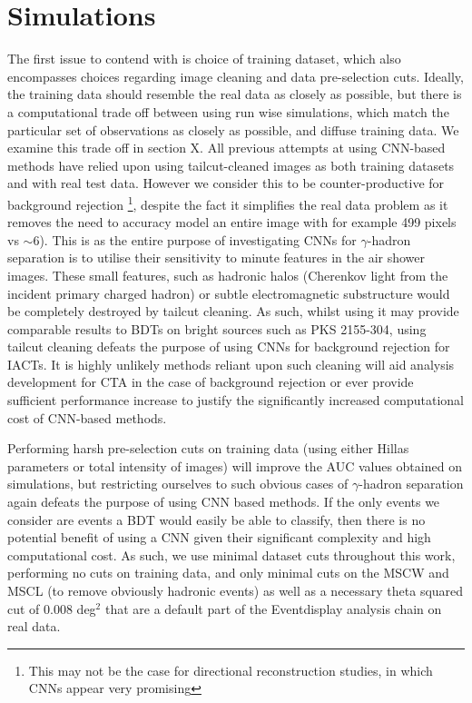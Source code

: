 \section{Simulations}
The first issue to contend with is choice of training dataset, which also encompasses choices regarding image cleaning and data pre-selection cuts. Ideally, the training data should resemble the real data as closely as possible, but there is a computational trade off between using run wise simulations, which match the particular set of observations as closely as possible, and diffuse training data. We examine this trade off in section X. All previous attempts at using CNN-based methods have relied upon using tailcut-cleaned images \cite{Shilon} as both training datasets and with real test data. However we consider this to be counter-productive for background rejection \footnote{This may not be the case for directional reconstruction studies, in which CNNs appear very promising}, despite the fact it simplifies the real data problem as it removes the need to accuracy model an entire image with for example 499 pixels vs $\sim$6). This is as the entire purpose of investigating CNNs for $\gamma$-hadron separation is to utilise their sensitivity to minute features in the air shower images. These small features, such as hadronic halos \cite{model++}(Cherenkov light from the incident primary charged hadron) or subtle electromagnetic substructure would be completely destroyed by tailcut cleaning. As such, whilst using it may provide comparable results to BDTs on bright sources such as PKS 2155-304, using tailcut cleaning defeats the purpose of using CNNs for background rejection for IACTs. It is highly unlikely methods reliant upon such cleaning will aid analysis development for CTA in the case of background rejection or ever provide sufficient performance increase to justify the significantly increased computational cost of CNN-based methods.

Performing harsh pre-selection cuts on training data (using either Hillas parameters or total intensity of images) will improve the AUC values obtained on simulations, but restricting ourselves to such obvious cases of $\gamma$-hadron separation again defeats the purpose of using CNN based methods. If the only events we consider are events a BDT would easily be able to classify, then there is no potential benefit of using a CNN given their significant complexity and high computational cost. As such, we use minimal dataset cuts throughout this work, performing no cuts on training data, and only minimal cuts on the MSCW and MSCL (to remove obviously hadronic events) as well as a necessary theta squared cut of 0.008 deg$^2$ that are a default part of the Eventdisplay analysis chain on real data.

